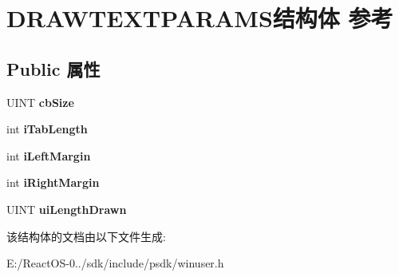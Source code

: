 \hypertarget{struct_d_r_a_w_t_e_x_t_p_a_r_a_m_s}{}\section{D\+R\+A\+W\+T\+E\+X\+T\+P\+A\+R\+A\+M\+S结构体 参考}
\label{struct_d_r_a_w_t_e_x_t_p_a_r_a_m_s}
\subsection*{Public 属性}
\begin{DoxyCompactItemize}
\item 
\mbox{\label{struct_d_r_a_w_t_e_x_t_p_a_r_a_m_s_a18544c9c12539c692abc3bd07ef06a22}} 
U\+I\+NT {\bfseries cb\+Size}
\item 
\mbox{\label{struct_d_r_a_w_t_e_x_t_p_a_r_a_m_s_a7a5f43339bcd2a7a0457a0e556a3c37d}} 
int {\bfseries i\+Tab\+Length}
\item 
\mbox{\label{struct_d_r_a_w_t_e_x_t_p_a_r_a_m_s_a183829f1dd7039a78ad6238ae964f8ca}} 
int {\bfseries i\+Left\+Margin}
\item 
\mbox{\label{struct_d_r_a_w_t_e_x_t_p_a_r_a_m_s_a0b9f1f836dc0371072181a918184b76a}} 
int {\bfseries i\+Right\+Margin}
\item 
\mbox{\label{struct_d_r_a_w_t_e_x_t_p_a_r_a_m_s_a52d4f6187c32c34f85257617e48d6a7d}} 
U\+I\+NT {\bfseries ui\+Length\+Drawn}
\end{DoxyCompactItemize}


该结构体的文档由以下文件生成\+:\begin{DoxyCompactItemize}
\item 
E\+:/\+React\+O\+S-\/0../sdk/include/psdk/winuser.\+h\end{DoxyCompactItemize}
